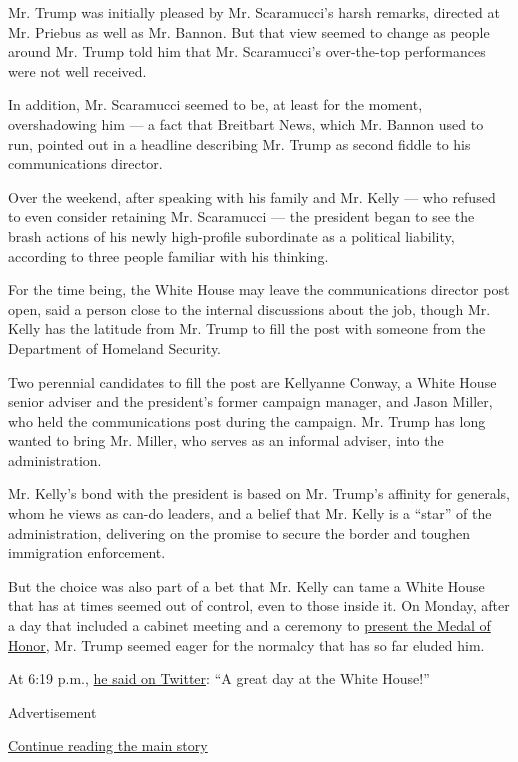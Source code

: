 Mr. Trump was initially pleased by Mr. Scaramucci's harsh remarks,
directed at Mr. Priebus as well as Mr. Bannon. But that view seemed to
change as people around Mr. Trump told him that Mr. Scaramucci's
over-the-top performances were not well received.

In addition, Mr. Scaramucci seemed to be, at least for the moment,
overshadowing him --- a fact that Breitbart News, which Mr. Bannon used
to run, pointed out in a headline describing Mr. Trump as second fiddle
to his communications director.

Over the weekend, after speaking with his family and Mr. Kelly --- who
refused to even consider retaining Mr. Scaramucci --- the president
began to see the brash actions of his newly high-profile subordinate as
a political liability, according to three people familiar with his
thinking.

For the time being, the White House may leave the communications
director post open, said a person close to the internal discussions
about the job, though Mr. Kelly has the latitude from Mr. Trump to fill
the post with someone from the Department of Homeland Security.

Two perennial candidates to fill the post are Kellyanne Conway, a White
House senior adviser and the president's former campaign manager, and
Jason Miller, who held the communications post during the campaign. Mr.
Trump has long wanted to bring Mr. Miller, who serves as an informal
adviser, into the administration.

Mr. Kelly's bond with the president is based on Mr. Trump's affinity for
generals, whom he views as can-do leaders, and a belief that Mr. Kelly
is a ``star'' of the administration, delivering on the promise to secure
the border and toughen immigration enforcement.

But the choice was also part of a bet that Mr. Kelly can tame a White
House that has at times seemed out of control, even to those inside it.
On Monday, after a day that included a cabinet meeting and a ceremony to
\href{https://www.nytimes.com/2017/07/31/us/politics/medal-of-honor-trump-james-mccloughan.html}{present
the Medal of Honor}, Mr. Trump seemed eager for the normalcy that has so
far eluded him.

At 6:19 p.m.,
\href{https://twitter.com/realDonaldTrump/status/892147656319004672}{he
said on Twitter}: ``A great day at the White House!''

Advertisement

\protect\hyperlink{after-bottom}{Continue reading the main story}

